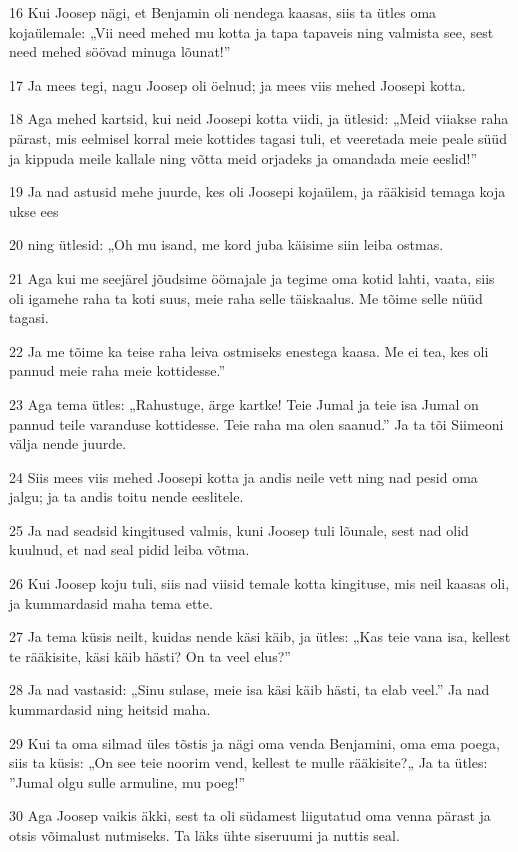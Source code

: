 \par 16 Kui Joosep nägi, et Benjamin oli nendega kaasas, siis ta ütles oma kojaülemale: „Vii need mehed mu kotta ja tapa tapaveis ning valmista see, sest need mehed söövad minuga lõunat!”
\par 17 Ja mees tegi, nagu Joosep oli öelnud; ja mees viis mehed Joosepi kotta.
\par 18 Aga mehed kartsid, kui neid Joosepi kotta viidi, ja ütlesid: „Meid viiakse raha pärast, mis eelmisel korral meie kottides tagasi tuli, et veeretada meie peale süüd ja kippuda meile kallale ning võtta meid orjadeks ja omandada meie eeslid!”
\par 19 Ja nad astusid mehe juurde, kes oli Joosepi kojaülem, ja rääkisid temaga koja ukse ees
\par 20 ning ütlesid: „Oh mu isand, me kord juba käisime siin leiba ostmas.
\par 21 Aga kui me seejärel jõudsime öömajale ja tegime oma kotid lahti, vaata, siis oli igamehe raha ta koti suus, meie raha selle täiskaalus. Me tõime selle nüüd tagasi.
\par 22 Ja me tõime ka teise raha leiva ostmiseks enestega kaasa. Me ei tea, kes oli pannud meie raha meie kottidesse.”
\par 23 Aga tema ütles: „Rahustuge, ärge kartke! Teie Jumal ja teie isa Jumal on pannud teile varanduse kottidesse. Teie raha ma olen saanud.” Ja ta tõi Siimeoni välja nende juurde.
\par 24 Siis mees viis mehed Joosepi kotta ja andis neile vett ning nad pesid oma jalgu; ja ta andis toitu nende eeslitele.
\par 25 Ja nad seadsid kingitused valmis, kuni Joosep tuli lõunale, sest nad olid kuulnud, et nad seal pidid leiba võtma.
\par 26 Kui Joosep koju tuli, siis nad viisid temale kotta kingituse, mis neil kaasas oli, ja kummardasid maha tema ette.
\par 27 Ja tema küsis neilt, kuidas nende käsi käib, ja ütles: „Kas teie vana isa, kellest te rääkisite, käsi käib hästi? On ta veel elus?”
\par 28 Ja nad vastasid: „Sinu sulase, meie isa käsi käib hästi, ta elab veel.” Ja nad kummardasid ning heitsid maha.
\par 29 Kui ta oma silmad üles tõstis ja nägi oma venda Benjamini, oma ema poega, siis ta küsis: „On see teie noorim vend, kellest te mulle rääkisite?„ Ja ta ütles: ”Jumal olgu sulle armuline, mu poeg!”
\par 30 Aga Joosep vaikis äkki, sest ta oli südamest liigutatud oma venna pärast ja otsis võimalust nutmiseks. Ta läks ühte siseruumi ja nuttis seal.
